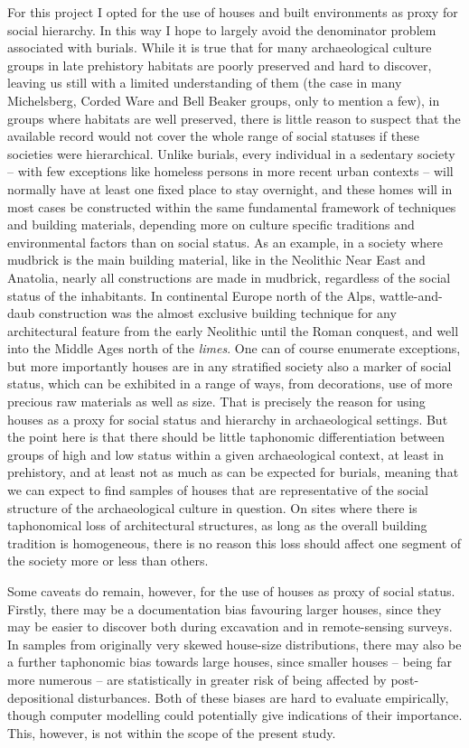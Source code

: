 \documentclass[
  12pt,
  a4paper, twoside]{book}
\begin{document}
For this project I opted for the use of houses and built environments as proxy for social hierarchy. In this way I hope to largely avoid the denominator problem associated with burials. While it is true that for many archaeological culture groups in late prehistory habitats are poorly preserved and hard to discover, leaving us still with a limited understanding of them (the case in many Michelsberg, Corded Ware and Bell Beaker groups, only to mention a few), in groups where habitats are well preserved, there is little reason to suspect that the available record would not cover the whole range of social statuses if these societies were hierarchical. Unlike burials, every individual in a sedentary society -- with few exceptions like homeless persons in more recent urban contexts -- will normally have at least one fixed place to stay overnight, and these homes will in most cases be constructed within the same fundamental framework of techniques and building materials, depending more on culture specific traditions and environmental factors than on social status. As an example, in a society where mudbrick is the main building material, like in the Neolithic Near East and Anatolia, nearly all constructions are made in mudbrick, regardless of the social status of the inhabitants. In continental Europe north of the Alps, wattle-and-daub construction was the almost exclusive building technique for any architectural feature from the early Neolithic until the Roman conquest, and well into the Middle Ages north of the \emph{limes}. One can of course enumerate exceptions, but more importantly houses are in any stratified society also a marker of social status, which can be exhibited in a range of ways, from decorations, use of more precious raw materials as well as size. That is precisely the reason for using houses as a proxy for social status and hierarchy in archaeological settings. But the point here is that there should be little taphonomic differentiation between groups of high and low status within a given archaeological context, at least in prehistory, and at least not as much as can be expected for burials, meaning that we can expect to find samples of houses that are representative of the social structure of the archaeological culture in question. On sites where there is taphonomical loss of architectural structures, as long as the overall building tradition is homogeneous, there is no reason this loss should affect one segment of the society more or less than others.

Some caveats do remain, however, for the use of houses as proxy of social status. Firstly, there may be a documentation bias favouring larger houses, since they may be easier to discover both during excavation and in remote-sensing surveys. In samples from originally very skewed house-size distributions, there may also be a further taphonomic bias towards large houses, since smaller houses -- being far more numerous -- are statistically in greater risk of being affected by post-depositional disturbances. Both of these biases are hard to evaluate empirically, though computer modelling could potentially give indications of their importance. This, however, is not within the scope of the present study.
\end{document}
